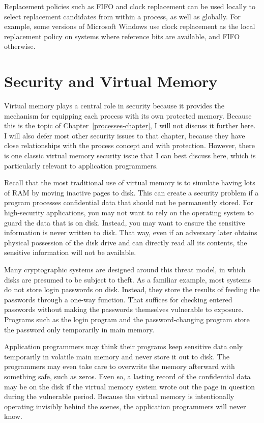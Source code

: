 Replacement policies such as FIFO and clock replacement can be used
locally to select replacement candidates from within a process, as
well as globally.  For example, some versions of Microsoft Windows use
clock replacement as the local replacement policy on systems where
reference bits are available, and FIFO otherwise.

\section{Security and Virtual Memory}\label{vm-security-section}
Virtual memory plays a central role in security because it provides
the mechanism for equipping each process with its own protected
memory.  Because this is the topic of Chapter~\ref{processes-chapter}, I will not
discuss it further here.  I will also defer most other security
issues to that chapter, because they have close relationships with the
process concept and with protection.  However, there is one classic
virtual memory security issue that I can best discuss here, which
is particularly relevant to application programmers.

Recall that the most traditional use of virtual memory is to simulate
having lots of RAM by moving inactive pages to disk.  This can create
a security problem if a program processes confidential data that
should not be permanently stored.  For high-security applications, you
may not want to rely on the operating system to guard the data that is
on disk.  Instead, you may want to ensure the sensitive information is
never written to disk.  That way, even if an adversary later obtains
physical possession of the disk drive and can directly read all its
contents, the sensitive information will not be available.

Many cryptographic systems are designed around this threat model, in
which disks are presumed to be subject to theft.  As a familiar
example, most systems do not store login passwords on disk.  Instead,
they store the results of feeding the passwords through a one-way
function.  That suffices for checking entered passwords without
making the passwords themselves vulnerable to exposure.  Programs such as the login program and the password-changing
program store the password only temporarily in main memory.

Application programmers may think their programs keep sensitive data
only temporarily in volatile main memory and never store it out to
disk.  The programmers may even take care to overwrite the memory
afterward with something safe, such as zeros.  Even so, a lasting record
of the confidential data may be on the disk if the virtual memory
system wrote out the page in question during the vulnerable period.  Because
the virtual memory is intentionally operating invisibly behind the
scenes, the application programmers will never know.


